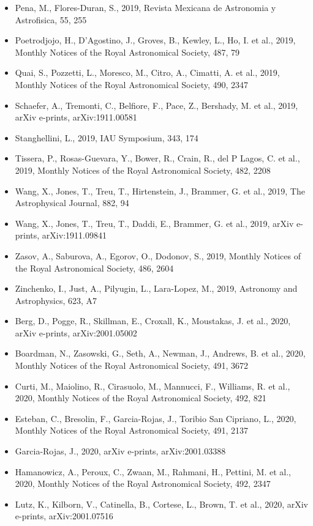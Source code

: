 \documentclass{letter}
\begin{document}
\begin{enumerate}
\begin{itemize}
\item Pena, M., Flores-Duran, S., 2019, Revista Mexicana de Astronomia y Astrofisica, 55, 255
\item Poetrodjojo, H., D'Agostino, J., Groves, B., Kewley, L., Ho, I. et al., 2019, Monthly Notices of the Royal Astronomical Society, 487, 79
\item Quai, S., Pozzetti, L., Moresco, M., Citro, A., Cimatti, A. et al., 2019, Monthly Notices of the Royal Astronomical Society, 490, 2347
\item Schaefer, A., Tremonti, C., Belfiore, F., Pace, Z., Bershady, M. et al., 2019, arXiv e-prints, arXiv:1911.00581
\item Stanghellini, L., 2019, IAU Symposium, 343, 174
\item Tissera, P., Rosas-Guevara, Y., Bower, R., Crain, R., del P Lagos, C. et al., 2019, Monthly Notices of the Royal Astronomical Society, 482, 2208
\item Wang, X., Jones, T., Treu, T., Hirtenstein, J., Brammer, G. et al., 2019, The Astrophysical Journal, 882, 94
\item Wang, X., Jones, T., Treu, T., Daddi, E., Brammer, G. et al., 2019, arXiv e-prints, arXiv:1911.09841
\item Zasov, A., Saburova, A., Egorov, O., Dodonov, S., 2019, Monthly Notices of the Royal Astronomical Society, 486, 2604
\item Zinchenko, I., Just, A., Pilyugin, L., Lara-Lopez, M., 2019, Astronomy and Astrophysics, 623, A7
\item Berg, D., Pogge, R., Skillman, E., Croxall, K., Moustakas, J. et al., 2020, arXiv e-prints, arXiv:2001.05002
\item Boardman, N., Zasowski, G., Seth, A., Newman, J., Andrews, B. et al., 2020, Monthly Notices of the Royal Astronomical Society, 491, 3672
\item Curti, M., Maiolino, R., Cirasuolo, M., Mannucci, F., Williams, R. et al., 2020, Monthly Notices of the Royal Astronomical Society, 492, 821
\item Esteban, C., Bresolin, F., Garcia-Rojas, J., Toribio San Cipriano, L., 2020, Monthly Notices of the Royal Astronomical Society, 491, 2137
\item Garcia-Rojas, J., 2020, arXiv e-prints, arXiv:2001.03388
\item Hamanowicz, A., Peroux, C., Zwaan, M., Rahmani, H., Pettini, M. et al., 2020, Monthly Notices of the Royal Astronomical Society, 492, 2347
\item Lutz, K., Kilborn, V., Catinella, B., Cortese, L., Brown, T. et al., 2020, arXiv e-prints, arXiv:2001.07516

\end{itemize}
\end{enumerate}
\end{document}
